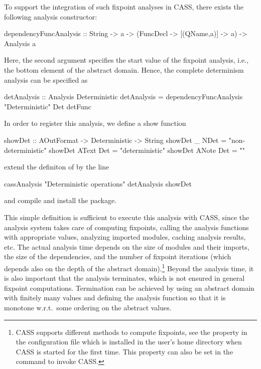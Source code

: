 To support the integration of such fixpoint analyses in CASS,
there exists the following analysis constructor:
\begin{curry}
dependencyFuncAnalysis :: String -> a -> (FuncDecl -> [(QName,a)] -> a)
                       -> Analysis a
\end{curry}
Here, the second argument specifies the start value of the fixpoint analysis,
i.e., the bottom element of the abstract domain.
Hence, the complete determinism analysis can be specified as
%
\begin{curry}
detAnalysis :: Analysis Deterministic
detAnalysis = dependencyFuncAnalysis "Deterministic" Det detFunc
\end{curry}
%
In order to register this analysis, we define a show function
%
\begin{curry}
showDet :: AOutFormat -> Deterministic -> String
showDet _     NDet = "non-deterministic"
showDet AText Det  = "deterministic"
showDet ANote Det  = ""
\end{curry}
%
extend the definiton of  by the line
%
\begin{curry}
cassAnalysis "Deterministic operations" detAnalysis showDet
\end{curry}
%
and compile and install the package.

This simple definition is sufficient to execute this analysis with CASS,
since the analysis system takes care of computing fixpoints,
calling the analysis functions with appropriate values,
analyzing imported modules, caching analysis results, etc.
The actual analysis time depends on the size of modules and their imports,
the size of the dependencies, and the
number of fixpoint iterations (which depends also on the depth
of the abstract domain).\footnote{CASS supports different
methods to compute fixpoints, see
the property  in the configuration file
 which is installed in the user's home directory
when CASS is started for the first time.
This property can also be set in the command to invoke CASS.}
Beyond the analysis time, it is also important that the analysis
terminates, which is not ensured in general fixpoint computations.
Termination can be achieved by using
an abstract domain with finitely many values and defining
the analysis function so that it is monotone w.r.t.\ some ordering
on the abstract values.


